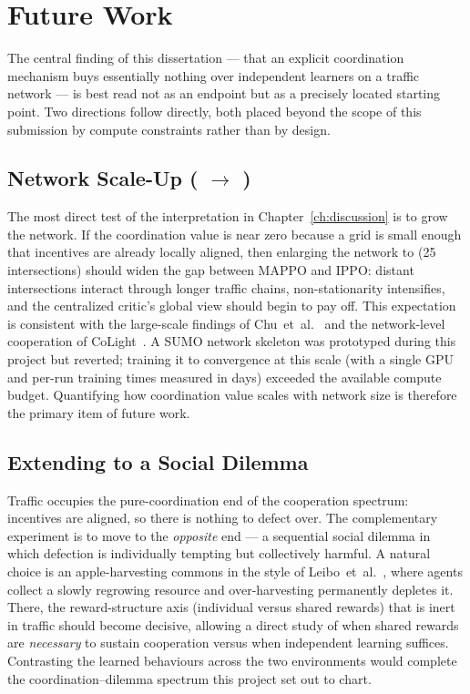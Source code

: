 \chapter{Future Work}
\label{ch:futurework}

The central finding of this dissertation --- that an explicit coordination mechanism
buys essentially nothing over independent learners on a  traffic network ---
is best read not as an endpoint but as a precisely located starting point. Two
directions follow directly, both placed beyond the scope of this submission by
compute constraints rather than by design.

\section{Network Scale-Up (\texorpdfstring{ $\rightarrow$ }{2x2 to 5x5})}
The most direct test of the interpretation in Chapter~\ref{ch:discussion} is to
grow the network. If the coordination value is near zero because a  grid is
small enough that incentives are already locally aligned, then enlarging the network
to  (25 intersections) should widen the gap between MAPPO and IPPO: distant
intersections interact through longer traffic chains, non-stationarity intensifies,
and the centralized critic's global view should begin to pay off. This expectation
is consistent with the large-scale findings of Chu~et~al.~\cite{chu2020largescale}
and the network-level cooperation of CoLight~\cite{wei2019colight}. A  SUMO
network skeleton was prototyped during this project but reverted; training it to
convergence at this scale (with a single GPU and per-run training times measured in
days) exceeded the available compute budget. Quantifying how coordination value
scales with network size is therefore the primary item of future work.

\section{Extending to a Social Dilemma}
Traffic occupies the pure-coordination end of the cooperation spectrum: incentives
are aligned, so there is nothing to defect over. The complementary experiment is to
move to the \emph{opposite} end --- a sequential social dilemma in which defection is
individually tempting but collectively harmful. A natural choice is an
apple-harvesting commons in the style of Leibo~et~al.~\cite{leibo2017ssd}, where
agents collect a slowly regrowing resource and over-harvesting permanently depletes
it. There, the reward-structure axis (individual versus shared rewards) that is
inert in traffic should become decisive, allowing a direct study of when shared
rewards are \emph{necessary} to sustain cooperation versus when independent learning
suffices. Contrasting the learned behaviours across the two environments would
complete the coordination--dilemma spectrum this project set out to chart.

